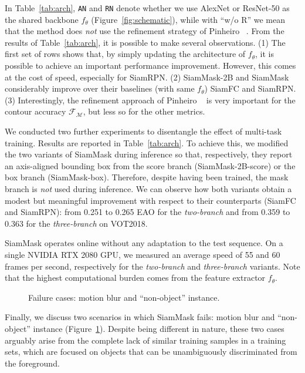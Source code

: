 In Table~\ref{tab:arch}, \texttt{AN} and \texttt{RN} denote whether we use AlexNet or ResNet-50 as the shared backbone $f_{\theta}$ (Figure~\ref{fig:schematic}), while with ``w/o R'' we mean that the method does \emph{not} use  the refinement strategy of Pinheiro \etal~\cite{SharpMask}.
From the results of Table~\ref{tab:arch}, it is possible to make several observations.
(1) The first set of rows shows that, by simply updating the architecture of $f_{\theta}$, it is possible to achieve an important performance improvement.
However, this comes at the cost of speed, especially for SiamRPN.
(2) SiamMask-2B and SiamMask considerably improve over their baselines (with same $f_{\theta}$) SiamFC and SiamRPN.
(3) Interestingly, the refinement approach of Pinheiro \etal~\cite{SharpMask} is very important for the contour accuracy $\mathcal{F}_{\mathcal{M}}$, but less so for the other metrics.

We conducted two further experiments to disentangle the effect of multi-task training.
Results are reported in Table~\ref{tab:arch}.
To achieve this, we modified the two variants of SiamMask during inference so that, respectively, they report an axis-aligned bounding box from the score branch (SiamMask-2B-score) or the box branch (SiamMask-box).
Therefore, despite having been trained, the mask branch is \emph{not} used during inference.
We can observe how both variants obtain a modest but meaningful improvement with respect to their counterparts (SiamFC and SiamRPN): from 0.251 to 0.265 EAO for the \emph{two-branch} and from 0.359 to 0.363 for the \emph{three-branch} on VOT2018.

SiamMask operates online without any adaptation to the test sequence.
On a single NVIDIA RTX 2080 GPU, we measured an average speed of 55 and 60 frames per second, respectively for the \emph{two-branch} and \emph{three-branch} variants.
Note that the highest computational burden comes from the feature extractor $f_{\theta}$.

\begin{figure}[t]
\centering

\caption{Failure cases: motion blur and ``non-object'' instance.}
\label{fig:fail}
\vspace{-0.2cm}
\end{figure}

Finally, we discuss two scenarios in which SiamMask fails: motion blur and ``non-object'' instance (Figure~\ref{fig:fail}).
Despite being different in nature, these two cases arguably arise from the complete lack of similar training samples in a training sets, which are focused on objects that can be unambiguously discriminated from the foreground.
